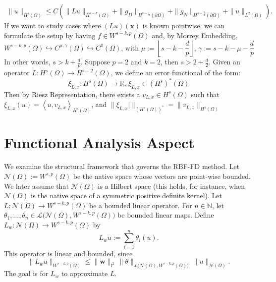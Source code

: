 \documentclass[11pt]{article}
\begin{document}
\begin{align*}
\|u\|_{H^s(\Omega)} \leq C\left(\|Lu\|_{H^{s-k}(\Omega)} + \|g_D\|_{H^{s-\frac{1}{2}}(\partial\Omega)} + \|g_N\|_{H^{s-\frac{3}{2}}(\partial\Omega)} + \|u\|_{L^2(\Omega)} \right).
\end{align*}
If we want to study cases where $(Lu)(\bm{x})$ is known pointwise, we can formulate the setup by having $f \in W^{s-k,p}(\Omega)$ and, by Morrey Embedding, 
\begin{equation*}
	W^{s-k,p}(\Omega) \hookrightarrow C^{\mu,\gamma}(\Omega) \hookrightarrow C^{0}(\Omega) \text{, with } \mu := \left \lfloor s-k-\frac{d}{p} \right \rfloor \text{, } \gamma := s-k-\mu-\frac{d}{p}
\end{equation*}
In other words, $s > k + \frac{d}{p}$. Suppose $p=2$ and $k=2$, then $s > 2 + \frac{d}{2}$. Given an operator $L: H^{s}(\Omega) \rightarrow H^{s-2}(\Omega)$, we define an error functional of the form:
\begin{equation*}
	\xi_{L,x}: H^{s}(\Omega) \rightarrow \mathbb{R} \text{, } \xi_{L,x} \in \left(H^{s}\right)^*(\Omega)
\end{equation*}
Then by Riesz Representation, there exists a $v_{L,x} \in H^{s}(\Omega)$ such that $\xi_{L,x} (u) = \left\langle u , v_{L,x} \right\rangle_{H^{s}(\Omega)}$, and $\| \xi_{L,x} |\|_{\left(H^{s}(\Omega)\right)^*} = \| v_{L,x} \|_{H^{s}(\Omega)}$

\pagebreak

\section{Functional Analysis Aspect}

We examine the structural framework that governs the RBF-FD method. Let $\mathcal{N}(\Omega):=W^{s,p}(\Omega)$ be the native space whose vectors are point-wise bounded. We later assume that $\mathcal{N}(\Omega)$ is a Hilbert space (this holds, for instance, when $\mathcal{N}(\Omega)$ is the native space of a symmetric positive definite kernel). Let $L:\mathcal{N}(\Omega) \rightarrow W^{s-k,p}(\Omega)$ be a bounded linear operator. For $n \in \mathbb{N}$, let $\theta_1, \dots, \theta_n \in \mathcal{L}\bigl(\mathcal{N}(\Omega), W^{s-k,p}(\Omega)\bigr)$ be bounded linear maps. Define $L_w:\mathcal{N}(\Omega) \rightarrow W^{s-k,p}(\Omega)$ by
\begin{equation}
	L_w u := \sum_{i=1}^n \theta_i(u).
\end{equation}
This operator is linear and bounded, since
\begin{equation*}
	\| L_w u \|_{W^{s-k,p}(\Omega)} \le \| \bm{w} \|_{l^2} \, \| \theta \|_{\mathcal{L}\bigl(\mathcal{N}(\Omega), W^{s-k,p}(\Omega)\bigr)} \, \| u \|_{\mathcal{N}(\Omega)}.
\end{equation*}
The goal is for $L_w$ to approximate $L$.
\end{document}
